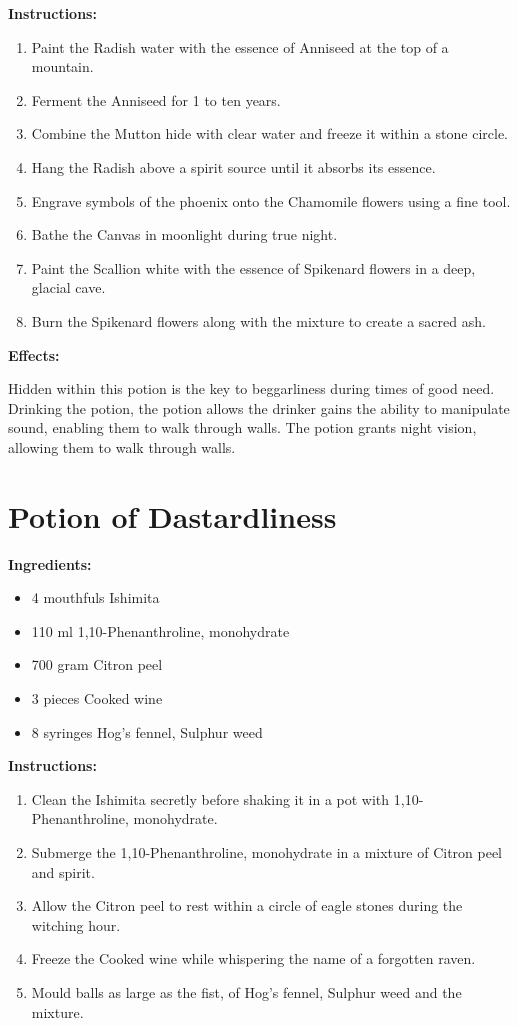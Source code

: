 \documentclass{article}
\begin{document}
\textbf{Instructions:}

\begin{enumerate}
  \item Paint the Radish water with the essence of Anniseed at the top of a mountain.
  \item Ferment the Anniseed for 1 to ten years.
  \item Combine the Mutton hide with clear water and freeze it within a stone circle.
  \item Hang the Radish above a spirit source until it absorbs its essence.
  \item Engrave symbols of the phoenix onto the Chamomile flowers using a fine tool.
  \item Bathe the Canvas in moonlight during true night.
  \item Paint the Scallion white with the essence of Spikenard flowers in a deep, glacial cave.
  \item Burn the Spikenard flowers along with the mixture to create a sacred ash.
\end{enumerate}

\textbf{Effects:}

Hidden within this potion is the key to beggarliness during times of good need. Drinking the potion, the potion allows the drinker gains the ability to manipulate sound, enabling them to walk through walls. The potion grants night vision, allowing them to walk through walls.

\newpage
\section*{Potion of Dastardliness}

\textbf{Ingredients:}

\begin{itemize}
  \item 4 mouthfuls Ishimita
  \item 110 ml 1,10-Phenanthroline, monohydrate
  \item 700 gram Citron peel
  \item 3 pieces Cooked wine
  \item 8 syringes Hog's fennel, Sulphur weed
\end{itemize}

\textbf{Instructions:}

\begin{enumerate}
  \item Clean the Ishimita secretly before shaking it in a pot with 1,10-Phenanthroline, monohydrate.
  \item Submerge the 1,10-Phenanthroline, monohydrate in a mixture of Citron peel and spirit.
  \item Allow the Citron peel to rest within a circle of eagle stones during the witching hour.
  \item Freeze the Cooked wine while whispering the name of a forgotten raven.
  \item Mould balls as large as the fist, of Hog's fennel, Sulphur weed and the mixture.
\end{enumerate}
\end{document}
